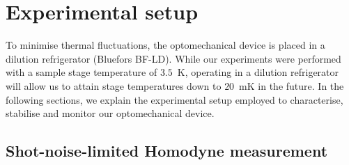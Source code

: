 \documentclass[./Main-revtex.tex]{subfiles}
\begin{document}


\section{Experimental setup}
 

To minimise thermal fluctuations, the optomechanical device is placed in a dilution refrigerator (Bluefors BF-LD). While our experiments were performed with a sample stage temperature of $3.5$~K, operating in a dilution refrigerator will allow us to attain stage temperatures down to $20$~mK in the future. In the following sections, we explain the experimental setup employed to characterise, stabilise and monitor our optomechanical device.

\subsection{Shot-noise-limited Homodyne measurement}\label{SecHomoSetup}
\end{document}
